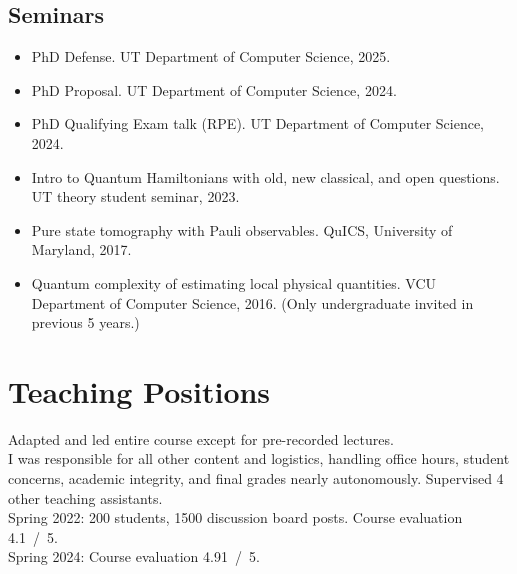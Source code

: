 \documentclass[11pt,letterpaper,serif]{moderncv}
\begin{document}
\subsection{Seminars}

\begin{itemize}
	\item[\textbullet] PhD Defense.\quad
	UT Department of Computer Science, 2025.

	\item[\textbullet] PhD Proposal.\quad
	UT Department of Computer Science, 2024.

	\item[\textbullet] PhD Qualifying Exam talk (RPE).\quad
	UT Department of Computer Science, 2024.

	\item[\textbullet] Intro to Quantum Hamiltonians with old, new classical, and open questions.\quad
	UT theory student seminar, 2023.

	\item[\textbullet] Pure state tomography with Pauli observables.\quad
	QuICS, University of Maryland, 2017.

	\item[\textbullet] Quantum complexity of estimating local physical quantities.\quad
	VCU Department of Computer Science, 2016.\quad
	(Only undergraduate invited in previous 5 years.)
\end{itemize}


\section{Teaching Positions}

{
	\begin{adjustwidth}{.25in}{}
		Adapted and led entire course except for pre-recorded lectures.\\
		I was responsible for all other content and logistics, handling office hours, student concerns, academic integrity, and final grades nearly autonomously.
		Supervised 4 other teaching assistants.\\
		Spring 2022: 200 students, 1500 discussion board posts. Course evaluation 4.1~/~5.
		\\ Spring 2024: Course evaluation 4.91~/~5.
	\end{adjustwidth}
}
\end{document}
